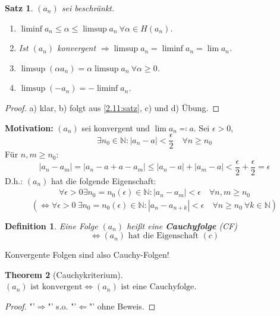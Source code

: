 \documentclass[12pt]{extreport} %
\newcommand{\N}{\mathbb{N}}
\theoremstyle{named}
\newtheorem{unnamedtheorem}{Theorem} \counterwithin{unnamedtheorem}{chapter}
\theoremstyle{dotless}
\newtheorem{satz}[unnamedtheorem]{Satz}
\newtheorem*{definition}{Definition}
\begin{document}
\begin{satz} \label{2.14:satz}
	$(a_{n})$ sei beschränkt.
	\begin{enumerate}
		\item $\liminf a_{n} \leq \alpha \leq \limsup a_{n} ~\forall \alpha \in H(a_{n})$.
		\item Ist $(a_{n})$ konvergent $\Rightarrow \limsup a_{n} = \liminf a_{n} = \lim a_{n}$.
		\item $\limsup(\alpha a_{n}) = \alpha \limsup a_{n} ~\forall \alpha \geq 0$.
		\item $\limsup(-a_{n}) = - \liminf a_{n}$.
	\end{enumerate}
\end{satz}

\begin{proof}
	a) klar, b) folgt aus \ref{2.11:satz}, c) und d) Übung.
\end{proof}


\textbf{Motivation:} $(a_{n})$ sei konvergent und $\lim a_{n} \eqqcolon a$. Sei $\epsilon > 0$,
	$$ \exists n_{0} \in \N: |a_{n} - a| < \frac{\epsilon}{2} \quad \forall n \geq n_{0} $$
Für $n, m \geq n_{0}$:
	$$ |a_{n} - a_{m}| = |a_{n} - a + a - a_{m} | \leq |a_{n} - a| + |a_{m} - a| < \frac{\epsilon}{2} + \frac{\epsilon}{2} = \epsilon $$
D.h.: $(a_{n})$ hat die folgende Eigenschaft:
	\begin{align*}
		\forall \epsilon > 0 \exists n_{0} = n_{0}(\epsilon) \in \N: |a_{n} - a_{m}| < \epsilon \quad \forall n,m \geq n_{0} \tag{c}
	\end{align*}
$$ (\iff \forall \epsilon > 0 ~\exists n_{0} = n_{0}(\epsilon) \in \N: |a_{n} - a_{n+k}| < \epsilon \quad \forall n \geq n_{0} ~\forall k \in \N) $$

\begin{definition} 
	Eine Folge $(a_{n})$ hei{\ss}t eine \textbf{Cauchyfolge} (CF)
	$$ \iff (a_{n}) \text{ hat die Eigenschaft } (c) $$	
\end{definition}


Konvergente Folgen sind also Cauchy-Folgen!

\begin{unnamedtheorem}[Cauchykriterium] $(a_{n}) \text{ ist konvergent} \iff (a_{n}) \text{ ist eine Cauchyfolge}$. \label{2.15:prop} 
\end{unnamedtheorem}

\begin{proof}
	"'$\Rightarrow$"' s.o. "'$\Leftarrow$"' ohne Beweis.
\end{proof}
\end{document}
